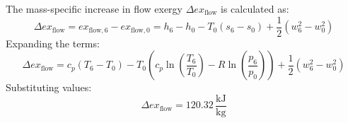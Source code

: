 The mass-specific increase in flow exergy \( \Delta ex_{\text{flow}} \) is calculated as:  
\[
\Delta ex_{\text{flow}} = ex_{\text{flow},6} - ex_{\text{flow},0} = h_6 - h_0 - T_0 \left( s_6 - s_0 \right) + \frac{1}{2} \left( w_6^2 - w_0^2 \right)
\]  
Expanding the terms:  
\[
\Delta ex_{\text{flow}} = c_p \left( T_6 - T_0 \right) - T_0 \left( c_p \ln \left( \frac{T_6}{T_0} \right) - R \ln \left( \frac{p_6}{p_0} \right) \right) + \frac{1}{2} \left( w_6^2 - w_0^2 \right)
\]  
Substituting values:  
\[
\Delta ex_{\text{flow}} = 120.32 \, \frac{\text{kJ}}{\text{kg}}
\]